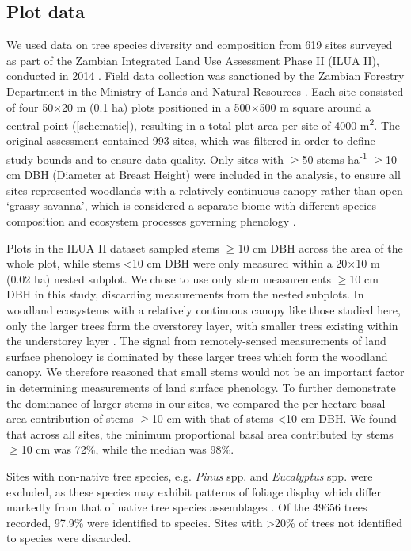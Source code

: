 \documentclass[11pt,a4paper]{article}
\begin{document}
\subsection{Plot data}

We used data on tree species diversity and composition from 619 sites surveyed
as part of the Zambian Integrated Land Use Assessment Phase II (ILUA II),
conducted in 2014 \citep{ILUA2016, Pelletier2018}. Field data collection was
sanctioned by the Zambian Forestry Department in the Ministry of Lands and
Natural Resources \citep{ILUA2016}. Each site consisted of four 50$\times$20 m
(0.1 ha) plots positioned in a 500$\times$500 m square around a central point
(\autoref{schematic}), resulting in a total plot area per site of \num{4000}
m\textsuperscript{2}. The original assessment contained 993 sites, which was
filtered in order to define study bounds and to ensure data quality. Only sites
with $\geq$50 stems ha\textsuperscript{-1} $\geq$10 cm DBH (Diameter at Breast
Height) were included in the analysis, to ensure all sites represented
woodlands with a relatively continuous canopy rather than open `grassy
savanna', which is considered a separate biome with different species
composition and ecosystem processes governing phenology \citep{Morellato2013,
Keith2020}. 

Plots in the ILUA II dataset sampled stems $\geq$10 cm DBH across the area of
the whole plot, while stems <10 cm DBH were only measured within a 20$\times$10
m (0.02 ha) nested subplot. We chose to use only stem measurements $\geq$10 cm
DBH in this study, discarding measurements from the nested subplots. In
woodland ecosystems with a relatively continuous canopy like those studied
here, only the larger trees form the overstorey layer, with smaller trees
existing within the understorey layer \citep{Chidumayo2001}. The signal from
remotely-sensed measurements of land surface phenology is dominated by these
larger trees which form the woodland canopy. We therefore reasoned that small
stems would not be an important factor in determining measurements of land
surface phenology. To further demonstrate the dominance of larger stems in our
sites, we compared the per hectare basal area contribution of stems $\geq$10 cm
with that of stems <10 cm DBH. We found that across all sites, the minimum
proportional basal area contributed by stems $\geq$10 cm was 72\%, while the
median was 98\%.

Sites with non-native tree species, e.g. \textit{Pinus} spp. and
\textit{Eucalyptus} spp. were excluded, as these species may exhibit patterns
of foliage display which differ markedly from that of native tree species
assemblages \citep{Broadhead2003}. Of the \num{49656} trees recorded, 97.9\%
were identified to species. Sites with >20\% of trees not identified to species
were discarded.
\end{document}

